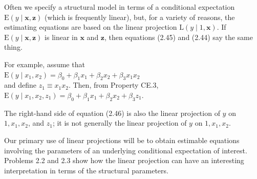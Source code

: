 \documentclass[10pt]{article}
\begin{document}
Often we specify a structural model in terms of a conditional expectation $\mathrm{E}(y \mid \mathbf{x}, \mathbf{z})$ (which is frequently linear), but, for a variety of reasons, the estimating equations are based on the linear projection $\mathrm{L}(y \mid 1, \mathbf{x})$. If $\mathrm{E}(y \mid \mathbf{x}, \mathbf{z})$ is linear in $\mathbf{x}$ and $\mathbf{z}$, then equations (2.45) and (2.44) say the same thing.

For example, assume that\\
$\mathrm{E}\left(y \mid x_{1}, x_{2}\right)=\beta_{0}+\beta_{1} x_{1}+\beta_{2} x_{2}+\beta_{3} x_{1} x_{2}$\\
and define $z_{1} \equiv x_{1} x_{2}$. Then, from Property CE.3,\\
$\mathrm{E}\left(y \mid x_{1}, x_{2}, z_{1}\right)=\beta_{0}+\beta_{1} x_{1}+\beta_{2} x_{2}+\beta_{3} z_{1}$.

The right-hand side of equation (2.46) is also the linear projection of $y$ on $1, x_{1}, x_{2}$, and $z_{1}$; it is not generally the linear projection of $y$ on $1, x_{1}, x_{2}$.

Our primary use of linear projections will be to obtain estimable equations involving the parameters of an underlying conditional expectation of interest. Problems 2.2 and 2.3 show how the linear projection can have an interesting interpretation in terms of the structural parameters.
\end{document}
